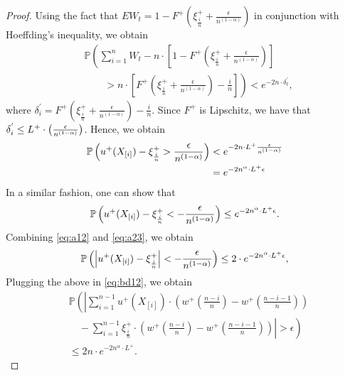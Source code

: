 \begin{proof}
Using the fact that 
$E W_t = 1-F^{+}\left(\xi^+_{\frac{i}{n}} +\frac{\epsilon}{n^{(1-\alpha)}}\right)$ in conjunction with Hoeffding's inequality, we obtain
\begin{align}
&\mathbb{P} \left( \sum _{i=1}^{n} W_t - n \cdot \left[1-F^{+}\left(\xi^+_{\frac{i}{n}} +\frac{\epsilon}{n^{(1-\alpha) }  } \right) \right] \right.\\
&\left.\qquad> n
\cdot \left[F^{+}\left(\xi^+_{\frac{i}{n}} +\frac{\epsilon}{n^{(1-\alpha)} } \right) - \frac{i}{n}\right]\right) < e^{-2n\cdot
\delta^{'}_t},
\end{align}
where $\delta^{'}_i = F^{+}\left(\xi^+_{\frac{i}{n}} +\frac{\epsilon} {n^{(1-\alpha)} }\right) - \frac{i}{n}$. Since 
$F^{+}$ is Lipschitz, we have that $ \delta^{'}_i \leq L^{+} \cdot \left(\frac{\epsilon}{n^{(1-\alpha)}}\right)$.
Hence, we obtain
\begin{align}
\mathbb{P}\left(  u^+(X_{[i]}) - \xi^+_{\frac{i}{n}} > \frac {\epsilon}{n^{(1-\alpha)}} \right) &< e^{-2n\cdot L^{+}
\frac{\epsilon}{n^{(1-\alpha)}} } \nonumber\\
&= e^{-2n^\alpha \cdot L ^{+} \epsilon}
\label{eq:a12}
\end{align}
In a  similar fashion, one can show that 
\begin{align}
\mathbb{P}\left(  u^+(X_{[i]}) -\xi^+_{\frac{i}{n}} < -\frac {\epsilon} {n^{(1-\alpha)}} \right) \leq e^{-2n^\alpha \cdot L^{+}  \epsilon}.
\label{eq:a23}
\end{align}
Combining \eqref{eq:a12} and \eqref{eq:a23},  we obtain 
\begin{align*}
\mathbb{P}\left(  \left| u^+(X_{[i]}) -\xi^+_{\frac{i}{n}} \right| < -\frac {\epsilon} {n^{(1-\alpha)}} \right) \leq 2\cdot
e^{-2n^\alpha \cdot L^{+} \epsilon} , 
\end{align*}
Plugging the above in \eqref{eq:bd12}, we obtain
\begin{align}
&
\mathbb{P} \left( \left| \sum_{i=1}^{n-1} u^+\left(X_{[i]}\right) \cdot \left(w^+\left(\frac{n-i}{n} \right)  - w^+\left(\frac{n-i-1}{n} \right) \right) \right.\right. \nonumber\\
&\left.\left.\quad -
\sum_{i=1}^{n-1} \xi^+_{\frac{i}{n}} \cdot \left(w^+\left(\frac{n-i}{n} \right)  - w^+\left(\frac{n-i-1}{n} \right) \right) \right| >
\epsilon\right) \nonumber\\
&\leq 2n\cdot e^{-2n^\alpha \cdot L^{+}}.\label{eq:holder-sample-complexity-extract}
\end{align}


\end{proof}
